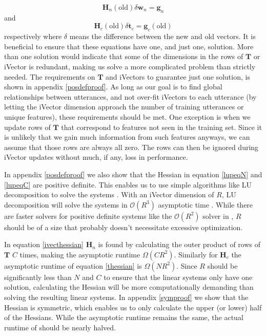 \begin{equation}\label{lupeqN}
\mathbf{H}_n(\text{old}) \delta\mathbf{w}_n = \mathbf{g}_n
\end{equation}
and
\begin{equation}\label{lupeqC}
\mathbf{H}_c(\text{old}) \delta \mathbf{t}_c = \mathbf{g}_c(\text{old})
\end{equation}
respectively where $\delta$ means the difference between the new and old vectors. It is beneficial to ensure that these equations have one, and just one, solution. More than one solution would indicate that some of the dimensions in the rows of $\mathbf{T}$ or iVector is redundant, making us solve a more complicated problem than strictly needed. The requirements on $\mathbf{T}$ and iVectors to guarantee just one solution, is shown in appendix \ref{posdefproof}. As long as our goal is to find global relationships between utterances, and not over-fit iVectors to each utterance (by letting the iVector dimension approach the number of training utterances or unique features), these requirements should be met. One exception is when we update rows of $\mathbf{T}$ that correspond to features not seen in the training set. Since it is unlikely that we gain much information from such features anyways, we can assume that those rows are always all zero. The rows can then be ignored during iVector updates without much, if any, loss in performance.

In appendix \ref{posdefproof} we also show that the Hessian in equation \ref{lupeqN} and \ref{lupeqC} are positive definite. This enables us to use simple algorithms like LU decomposition to solve the systems \cite[p. 749]{cormen}. With an iVector dimension of $R$, LU decomposition will solve the systems in $\mathcal{O}(R^3)$ asymptotic time \cite[p. 750]{cormen}. While there are faster solvers for positive definite systems like the $\mathcal{O}(R^2)$ solver in \cite{tewfik1994fast}, $R$ should be of a size that probably doesn't necessitate excessive optimization.

In equation \ref{ivecthessian} $\mathbf{H}_n$ is found by calculating the outer product of rows of $\mathbf{T}$ $C$ times, making the asymptotic runtime $\Omega(CR^2)$. Similarly for $\mathbf{H}_c$ the asymptotic runtime of equation \ref{thessian} is  $\Omega(NR^2)$. Since $R$ should be significantly less than $N$ and $C$ to ensure that the linear systems only have one solution, calculating the Hessian will be more computationally demanding than solving the resulting linear systems. In appendix \ref{symproof} we show that the Hessian is symmetric, which enables us to only calculate the upper (or lower) half of the Hessians. While the asymptotic runtime remains the same, the actual runtime of should be nearly halved. 

